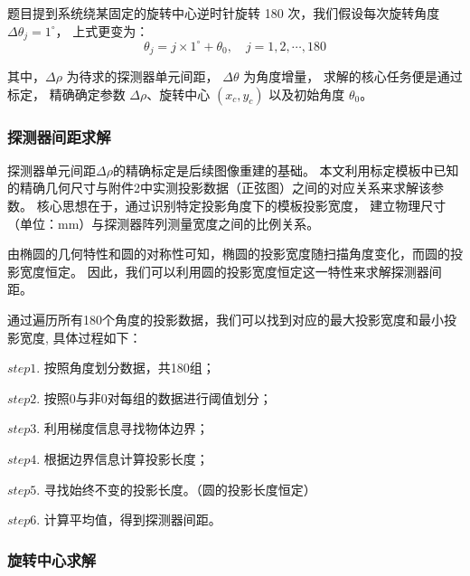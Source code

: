 题目提到系统绕某固定的旋转中心逆时针旋转 180 次，我们假设每次旋转角度 $\Delta\theta_j = 1^\circ$，
上式更变为：
\begin{equation*}
    \theta_j = j \times 1^\circ + \theta_0, \quad j=1,2,\cdots,180
\end{equation*}

其中，$\Delta\rho$ 为待求的探测器单元间距，
$\Delta\theta$ 为角度增量，
求解的核心任务便是通过标定，
精确确定参数 $\Delta\rho$、旋转中心 $(x_c, y_c)$ 以及初始角度 $\theta_0$。


\subsubsection{探测器间距求解}

探测器单元间距$\Delta\rho$的精确标定是后续图像重建的基础。
本文利用标定模板中已知的精确几何尺寸与附件2中实测投影数据（正弦图）之间的对应关系来求解该参数。
核心思想在于，通过识别特定投影角度下的模板投影宽度，
建立物理尺寸（单位：mm）与探测器阵列测量宽度之间的比例关系。\par


由椭圆的几何特性和圆的对称性可知，椭圆的投影宽度随扫描角度变化，而圆的投影宽度恒定。
因此，我们可以利用圆的投影宽度恒定这一特性来求解探测器间距。\par

通过遍历所有180个角度的投影数据，我们可以找到对应的最大投影宽度和最小投影宽度,
具体过程如下：\par
$step1.$ 按照角度划分数据，共180组；\par
$step2.$ 按照0与非0对每组的数据进行阈值划分；\par
$step3.$ 利用梯度信息寻找物体边界；\par
$step4.$ 根据边界信息计算投影长度；\par
$step5.$ 寻找始终不变的投影长度。（圆的投影长度恒定）\par
$step6.$ 计算平均值，得到探测器间距。


\subsubsection{旋转中心求解}

